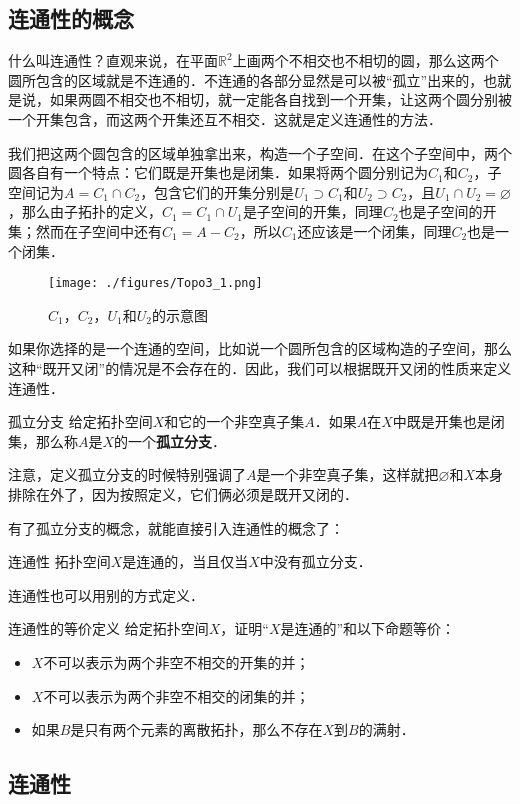 
\subsection{连通性的概念}
什么叫连通性？直观来说，在平面$\mathbb{R}^2$上画两个不相交也不相切的圆，那么这两个圆所包含的区域就是不连通的．不连通的各部分显然是可以被“孤立”出来的，也就是说，如果两圆不相交也不相切，就一定能各自找到一个开集，让这两个圆分别被一个开集包含，而这两个开集还互不相交．这就是定义连通性的方法．

我们把这两个圆包含的区域单独拿出来，构造一个子空间．在这个子空间中，两个圆各自有一个特点：它们既是开集也是闭集．如果将两个圆分别记为$C_1$和$C_2$，子空间记为$A=C_1\cap C_2$，包含它们的开集分别是$U_1\supset C_1$和$U_2\supset C_2$，且$U_1\cap U_2=\varnothing$，那么由子拓扑的定义，$C_1=C_1\cap U_1$是子空间的开集，同理$C_2$也是子空间的开集；然而在子空间中还有$C_1=A-C_2$，所以$C_1$还应该是一个闭集，同理$C_2$也是一个闭集．

\begin{figure}[ht]
\centering
\texttt{[image: ./figures/Topo3\_1.png]}
\caption{$C_1$，$C_2$，$U_1$和$U_2$的示意图} \label{Topo3_fig1}
\end{figure}

如果你选择的是一个连通的空间，比如说一个圆所包含的区域构造的子空间，那么这种“既开又闭”的情况是不会存在的．因此，我们可以根据既开又闭的性质来定义连通性．

\begin{definition}{孤立分支}
给定拓扑空间$X$和它的一个非空真子集$A$．如果$A$在$X$中既是开集也是闭集，那么称$A$是$X$的一个\textbf{孤立分支}．
\end{definition}

注意，定义孤立分支的时候特别强调了$A$是一个非空真子集，这样就把$\varnothing$和$X$本身排除在外了，因为按照定义，它们俩必须是既开又闭的．

有了孤立分支的概念，就能直接引入连通性的概念了：

\begin{definition}{连通性}
拓扑空间$X$是连通的，当且仅当$X$中没有孤立分支．
\end{definition}

连通性也可以用别的方式定义．

\begin{exercise}{连通性的等价定义}\label{Topo3_exe1}
给定拓扑空间$X$，证明“$X$是连通的”和以下命题等价：
\begin{itemize}
\item $X$不可以表示为两个非空不相交的开集的并；
\item $X$不可以表示为两个非空不相交的闭集的并；
\item 如果$B$是只有两个元素的离散拓扑，那么不存在$X$到$B$的满射．

\end{itemize}
\end{exercise}

\subsection{连通性}